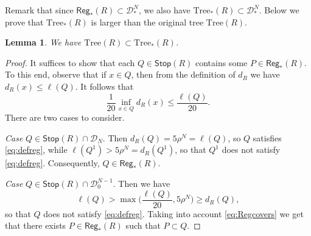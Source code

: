 \documentclass[11pt,reqno]{amsart}
\newcommand{\Tr}{\mathrm{Tree}}
\newcommand{\Stop}{\mathsf{Stop}}
\newcommand{\fr}[2]{\frac{#1}{#2}}
\newtheorem{lemma}[theorem]{Lemma}
\theoremstyle{definition}
\theoremstyle{remark}
\numberwithin{equation}{section}
\newcommand{\DD}{\mathcal{D}}
\newcommand{\Reg}{\mathsf{Reg}_*}
\theoremstyle{theorem}
\theoremstyle{definition}
\theoremstyle{remark}
\numberwithin{equation}{section}
\begin{document}
	Remark that since $\Reg(R)\subset \DD_*^N$, we also have $\Tr_*(R)\subset\DD_*^N$. Below we prove that $\Tr_*(R)$ is larger than the original tree $\Tr(R)$.
	\begin{lemma}
		We have $\Tr(R)\subset\Tr_*(R)$.
	\end{lemma}
	\begin{proof}
		It suffices to show that each $Q\in\Stop(R)$ contains some $P\in\Reg(R)$. To this end, observe that if $x\in Q$, then from the definition of $d_R$ we have $d_R(x)\le \ell(Q)$. It follows that
		\begin{equation*}
		\fr{1}{20}\inf_{x\in Q} d_R(x)\le \fr{\ell(Q)}{20}.
		\end{equation*}
		There are two cases to consider.
		
		\emph{Case} $Q\in\Stop(R)\cap\DD_N$. Then $d_R(Q) = 5\rho^N = \ell(Q)$, so $Q$ satisfies \eqref{eq:defreg}, while $\ell(Q^1)>5\rho^N=d_R(Q^1)$, so that $Q^1$ does not satisfy \eqref{eq:defreg}. Consequently, $Q\in\Reg(R)$.
		
		\emph{Case} $Q\in\Stop(R)\cap\DD_0^{N-1}$. Then we have
			\begin{equation*}
			\ell(Q)>\max\bigg(\fr{\ell(Q)}{20}, 5\rho^N\bigg)\ge d_R(Q),
			\end{equation*}
			so that $Q$ does not satisfy \eqref{eq:defreg}. Taking into account \eqref{eq:Regcovers} we get that there exists $P\in\Reg(R)$ such that $P\subset Q$.
	\end{proof}
\end{document}
